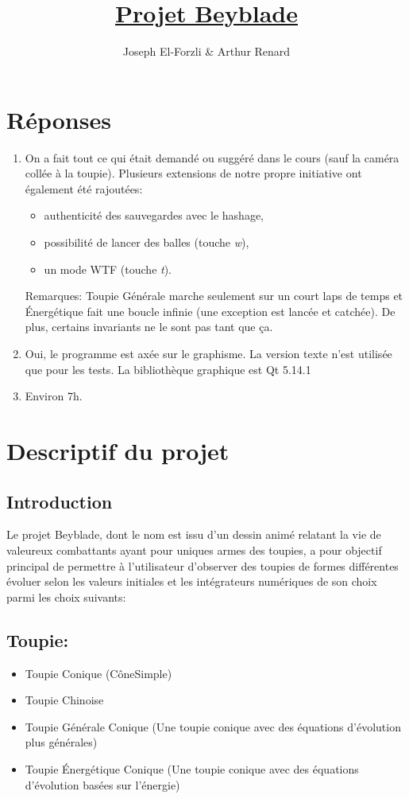 \documentclass[a4paper]{article}%
\begin{document}
\author{Joseph El-Forzli & Arthur Renard}
\date{}
\title{\textbf{\underline{Projet Beyblade}}}
\maketitle

\section {Réponses}
	\begin {enumerate}
		\item On a fait tout ce qui était demandé ou suggéré dans le cours (sauf la caméra collée à la toupie). Plusieurs extensions de notre propre initiative ont également été rajoutées: 
			\begin {itemize} 
				\item authenticité des sauvegardes avec le hashage, 
				\item possibilité de lancer des balles (touche \emph{w}),
				\item un mode WTF (touche \emph{t}).
			\end {itemize}
		Remarques: Toupie Générale marche seulement sur un court laps de temps et Énergétique fait une boucle infinie (une exception est lancée et catchée). De plus, certains invariants ne le sont pas tant que ça.
		\item Oui, le programme est axée sur le graphisme. La version texte n'est utilisée que pour les tests. La bibliothèque graphique est Qt 5.14.1
		\item Environ 7h.
	\end {enumerate}
\section {Descriptif du projet}
	\subsection{Introduction}
		Le projet Beyblade, dont le nom est issu d'un dessin animé relatant la vie de valeureux combattants ayant pour uniques armes des toupies, a pour objectif principal de permettre à l'utilisateur d'observer des toupies de formes différentes évoluer selon les valeurs initiales et les intégrateurs numériques de son choix parmi les choix suivants: 
	
	\subsection {Toupie:} 
		\begin {itemize} 
			\item Toupie Conique (CôneSimple)
			\item Toupie Chinoise 
			\item Toupie Générale Conique (Une toupie conique avec des équations d'évolution plus générales)
			\item Toupie Énergétique Conique (Une toupie conique avec des équations d'évolution basées sur l'énergie)
		\end {itemize} \\
	
\end{document}
